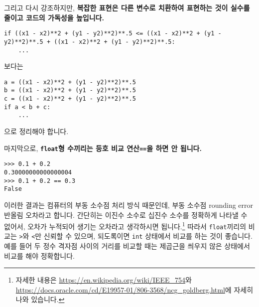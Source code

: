 \documentclass[../main.tex]{subfiles}
\begin{document}
그리고 다시 강조하지만, \textbf{복잡한 표현은 다른 변수로 치환하여 표현하는 것이 실수를 줄이고 코드의 가독성을 높입니다.}
\begin{verbatim}
if ((x1 - x2)**2 + (y1 - y2)**2)**.5 <= ((x1 - x2)**2 + (y1 - y2)**2)**.5 + ((x1 - x2)**2 + (y1 - y2)**2)**.5:
	...
\end{verbatim}
보다는
\begin{verbatim}
a = ((x1 - x2)**2 + (y1 - y2)**2)**.5
b = ((x1 - x2)**2 + (y1 - y2)**2)**.5
c = ((x1 - x2)**2 + (y1 - y2)**2)**.5
if a < b + c:
	...
\end{verbatim}
으로 정리해야 합니다.

마지막으로, \textbf{\texttt{float}형 수끼리는 등호 비교 연산\texttt{==}을 하면 안 됩니다.}
\begin{verbatim}
>>> 0.1 + 0.2
0.30000000000000004
>>> 0.1 + 0.2 == 0.3
False
\end{verbatim}
이러한 결과는 컴퓨터의 부동 소수점 처리 방식 때문인데, 부동 소수점 rounding error반올림 오차라고 합니다.
간단히는 이진수 소수로 십진수 소수를 정확하게 나타낼 수 없어서, 오차가 누적되어 생기는 오차라고 생각하시면 됩니다.\footnote{자세한 내용은 \url{https://en.wikipedia.org/wiki/IEEE_754}와 \url{https://docs.oracle.com/cd/E19957-01/806-3568/ncg_goldberg.html}에 자세히 나와 있습니다.}
따라서 \texttt{float}끼리의 비교는 \texttt{>}와 \texttt{<}만 신뢰할 수 있으며, 되도록이면 \texttt{int} 상태에서 비교를 하는 것이 좋습니다.
예를 들어 두 정수 격자점 사이의 거리를 비교할 때는 제곱근을 씌우지 않은 상태에서 비교를 해야 정확합니다.
\end{document}
